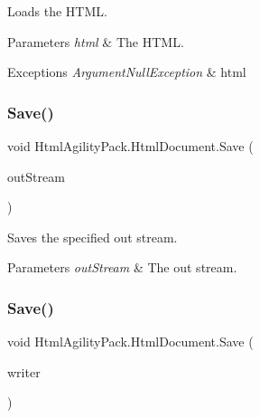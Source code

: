 Loads the H\+T\+ML. 


\begin{DoxyParams}{Parameters}
{\em html} & The H\+T\+ML.\\
\hline
\end{DoxyParams}

\begin{DoxyExceptions}{Exceptions}
{\em Argument\+Null\+Exception} & html\\
\hline
\end{DoxyExceptions}
\mbox{\label{class_html_agility_pack_1_1_html_document_a6b4268c9c7eef3ee96d47e6e9b6a2ee8}} 
\subsubsection{\texorpdfstring{Save()}{Save()}\hspace{0.1cm}{\footnotesize\ttfamily [1/7]}}
{\footnotesize\ttfamily void Html\+Agility\+Pack.\+Html\+Document.\+Save (\begin{DoxyParamCaption}\item[{Stream}]{out\+Stream }\end{DoxyParamCaption})\hspace{0.3cm}{\ttfamily [inline]}}



Saves the specified out stream. 


\begin{DoxyParams}{Parameters}
{\em out\+Stream} & The out stream.\\
\hline
\end{DoxyParams}
\mbox{\label{class_html_agility_pack_1_1_html_document_a6f796eece6d20e32c1da69e762f43e3b}} 
\subsubsection{\texorpdfstring{Save()}{Save()}\hspace{0.1cm}{\footnotesize\ttfamily [2/7]}}
{\footnotesize\ttfamily void Html\+Agility\+Pack.\+Html\+Document.\+Save (\begin{DoxyParamCaption}\item[{Stream\+Writer}]{writer }\end{DoxyParamCaption})\hspace{0.3cm}{\ttfamily [inline]}}



